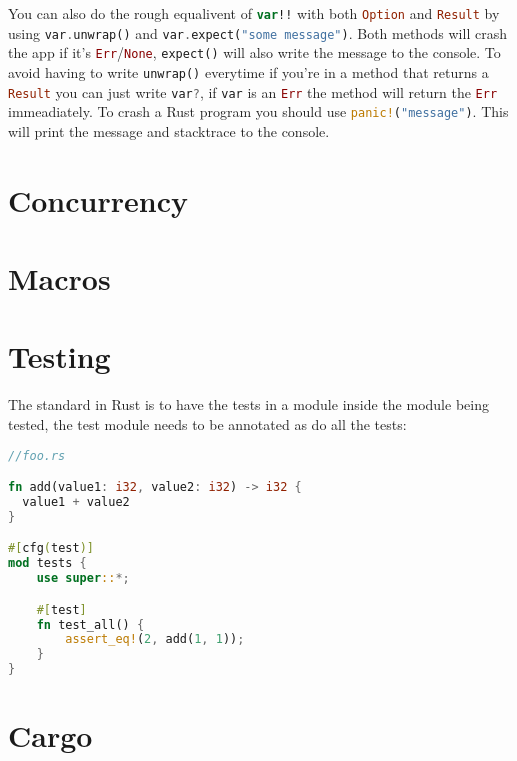 \documentclass[a4paper,11pt]{article}
\begin{document}
You can also do the rough equalivent of  \lstinline[language=Kotlin]{var!!} with both \lstinline[language=Rust]{Option} and \lstinline[language=Rust]{Result} by using \lstinline[language=Rust]{var.unwrap()} and \lstinline[language=Rust]{var.expect("some message")}. Both methods will crash the app if it's \lstinline[language=Rust]{Err}/\lstinline[language=Rust]{None}, \lstinline[language=Rust]{expect()} will also write the message to the console.
\newline
To avoid having to write \lstinline[language=Rust]{unwrap()} everytime if you're in a method that returns a \lstinline[language=Rust]{Result} you can just write \lstinline[language=Rust]{var?}, if \lstinline{var} is an \lstinline[language=Rust]{Err} the method will return the \lstinline[language=Rust]{Err} immeadiately.
\newline
To crash a Rust program you should use \lstinline[language=Rust]{panic!("message")}. This will print the message and stacktrace to the console.

\newpage
\section{Concurrency}

\newpage
\section{Macros}

\newpage
\section{Testing}
The standard in Rust is to have the tests in a module inside the module being tested, the test module needs to be annotated as do all the tests:
\begin{lstlisting}[language=Rust,frame=single]
//foo.rs 

fn add(value1: i32, value2: i32) -> i32 {
  value1 + value2
}

#[cfg(test)]
mod tests {
    use super::*;

    #[test]
    fn test_all() {
        assert_eq!(2, add(1, 1));
    }
}
\end{lstlisting}

\newpage
\section{Cargo}
\end{document}
